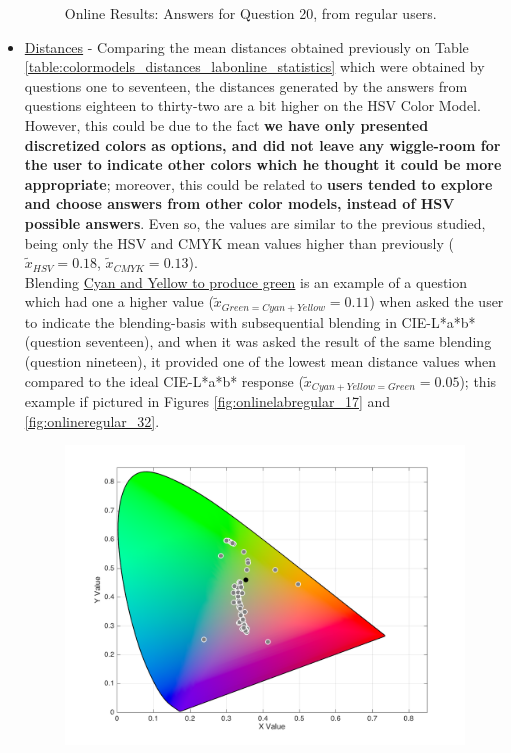 \begin{itemize}
\begin{figure}[!htbp]
    \caption[Online Results: Answers for Question 20, from regular users.]{Online Results: Answers for Question 20, from regular users.}
    \label{fig:onlineregular_20}
  \end{figure}
  \item \ul{Distances} - Comparing the mean distances obtained previously on Table \ref{table:colormodels_distances_labonline_statistics} which were obtained by questions one to seventeen, the distances generated
  by the answers from questions eighteen to thirty-two are a bit higher on the HSV Color Model. However, this could be due to the fact \textbf{we have only presented discretized colors as options, and did not
  leave any wiggle-room for the user to indicate other colors which he thought it could be more appropriate}; moreover, this could be related to \textbf{users tended to explore and choose answers from other color
  models, instead of HSV possible answers}. Even so, the values are similar to the previous studied, being only the HSV and CMYK mean values higher than previously ($\tilde{x}_{HSV} = 0.18$, $\tilde{x}_{CMYK} = 0.13$).\\
  Blending \ul{Cyan and Yellow to produce green} is an example of a question which had one a higher value ($\tilde{x}_{Green = Cyan + Yellow} = 0.11$) when asked the user to indicate the blending-basis with subsequential
  blending in CIE-L*a*b* (question seventeen), and when it was asked the result of the same blending (question nineteen), it provided one of the lowest mean distance values when compared to the ideal CIE-L*a*b* response
  ($\tilde{x}_{Cyan + Yellow = Green} = 0.05$); this example if pictured in Figures
  \ref{fig:onlinelabregular_17} and \ref{fig:onlineregular_32}.
  \begin{figure}[!htbp]
    \centering
    \begin{minipage}{0.48\textwidth}
      \centering
      \includegraphics[width=\textwidth]{images/results/17_online_Labresponses.png}

\end{minipage}
\end{figure}
\end{itemize}
